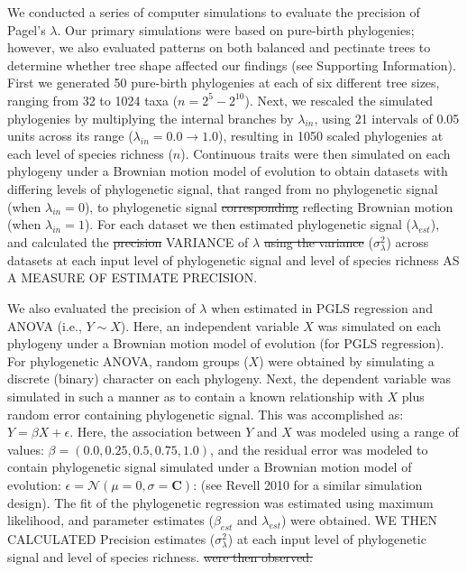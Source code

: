 \documentclass[
]{article}
\begin{document}
We conducted a series of computer simulations to evaluate the precision
of Pagel's \(\lambda\). Our primary simulations were based on pure-birth
phylogenies; however, we also evaluated patterns on both balanced and
pectinate trees to determine whether tree shape affected our findings
(see Supporting Information). First we generated 50 pure-birth
phylogenies at each of six different tree sizes, ranging from 32 to 1024
taxa (\(n=2^5 - 2^{10}\)). Next, we rescaled the simulated phylogenies
by multiplying the internal branches by \(\lambda_{in}\), using 21
intervals of 0.05 units across its range
(\(\lambda_{in} = 0.0 \to 1.0\)), resulting in 1050 scaled phylogenies
at each level of species richness (\(n\)). Continuous traits were then
simulated on each phylogeny under a Brownian motion model of evolution
to obtain datasets with differing levels of phylogenetic signal, that
ranged from no phylogenetic signal (when \(\lambda_{in} =0\)), to
phylogenetic signal \sout{corresponding} reflecting Brownian motion
(when \(\lambda_{in} =1\)). For each dataset we then estimated
phylogenetic signal (\(\lambda_{est}\)), and calculated the
\sout{precision} VARIANCE of \(\lambda\) \sout{using the variance}
(\(\sigma^2_\lambda\)) across datasets at each input level of
phylogenetic signal and level of species richness AS A MEASURE OF
ESTIMATE PRECISION. \hfill\break

We also evaluated the precision of \(\lambda\) when estimated in PGLS
regression and ANOVA (i.e., \(Y\sim{X}\)). Here, an independent variable
\(X\) was simulated on each phylogeny under a Brownian motion model of
evolution (for PGLS regression). For phylogenetic ANOVA, random groups
(\(X\)) were obtained by simulating a discrete (binary) character on
each phylogeny. Next, the dependent variable was simulated in such a
manner as to contain a known relationship with \(X\) plus random error
containing phylogenetic signal. This was accomplished as:
\(Y=\beta{X}+\epsilon\). Here, the association between \(Y\) and \(X\)
was modeled using a range of values:
\(\beta=(0.0,0.25, 0.5, 0.75,1.0)\), and the residual error was modeled
to contain phylogenetic signal simulated under a Brownian motion model
of evolution: \(\epsilon=\mathcal{N}(\mu=0,\sigma=\mathbf{C})\): (see
Revell 2010 for a similar simulation design). The fit of the
phylogenetic regression was estimated using maximum likelihood, and
parameter estimates (\(\beta_{est}\) and \(\lambda_{est}\)) were
obtained. WE THEN CALCULATED Precision estimates (\(\sigma^2_\lambda\))
at each input level of phylogenetic signal and level of species
richness. \sout{were then observed.} \hfill\break
\end{document}

